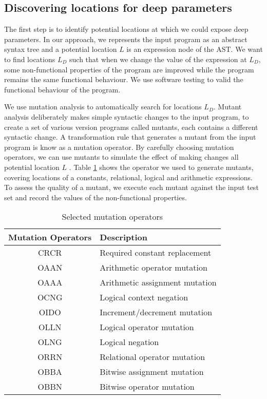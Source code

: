 \subsection{Discovering locations for deep parameters}

The first step is to identify potential locations at which we could expose deep parameters. 
In our approach, we represents the input program as an abstract syntax tree and a potential location $L$ is an expression node of the AST. 
We want to find locations $L_D$ such that when we change the value of the expression at $L_D$, some non-functional properties of the program are improved while the program remains the same functional behaviour. 
We use software testing to valid the functional behaviour of the program. 

We use mutation analysis to automatically search for locations $L_D$. Mutant analysis deliberately makes simple syntactic changes to the input program, to create a set of various version programs called mutants, each contains a different syntactic change. A transformation rule that generates a mutant from the input program is know as a mutation operator. By carefully choosing mutation operators, we can use mutants to simulate the effect of making changes all potential location $L$ . Table \ref{tab:cmop} shows the operator we used to generate mutants, covering locations of a constants, relational, logical and arithmetic expressions. 
To assess the quality of a mutant, we execute each mutant against the input test set and record the values of the non-functional properties. 

\begin{table} [htbp]
\caption{Selected mutation operators}
\label{tab:cmop} 
\begin{center}
\begin{tabular}{ | c | l |}
  \hline
  Mutation Operators & Description \\ 
\hline
  CRCR & Required constant replacement \\
  OAAN & Arithmetic operator mutation \\
  OAAA & Arithmetic assignment mutation \\
  OCNG & Logical context negation \\
  OIDO & Increment/decrement mutation  \\
  OLLN & Logical operator mutation  \\ 
  OLNG & Logical negation \\
  ORRN & Relational operator mutation \\
  OBBA & Bitwise assignment mutation \\
  OBBN & Bitwise operator mutation \\
\hline
\end{tabular} 
\end{center} 
\end{table} 

